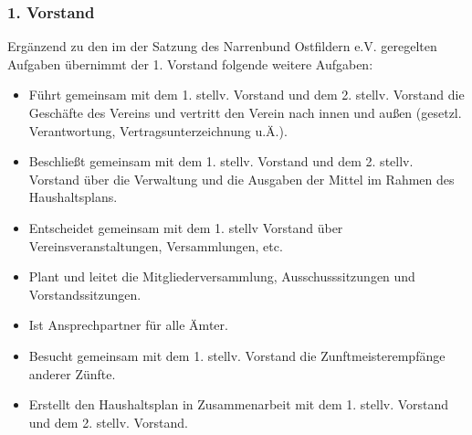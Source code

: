 \subsubsection{1. Vorstand}
Ergänzend zu den im  der Satzung des Narrenbund Ostfildern e.V. geregelten Aufgaben übernimmt der 1. Vorstand folgende weitere Aufgaben:
\begin{itemize}
    \item Führt gemeinsam mit dem 1. stellv. Vorstand und dem 2. stellv. Vorstand die Geschäfte des Vereins und vertritt den Verein nach innen und außen (gesetzl. Verantwortung, Vertragsunterzeichnung u.Ä.).

    \item Beschließt gemeinsam mit dem 1. stellv. Vorstand und dem 2. stellv. Vorstand über die Verwaltung und die Ausgaben der Mittel im Rahmen des Haushaltsplans.

    \item Entscheidet gemeinsam mit dem 1. stellv Vorstand über Vereinsveranstaltungen, Versammlungen, etc.

    \item Plant und leitet die Mitgliederversammlung, Ausschusssitzungen und Vorstandssitzungen.

    \item Ist Ansprechpartner für alle Ämter.

    \item Besucht gemeinsam mit dem 1. stellv. Vorstand die Zunftmeisterempfänge anderer Zünfte.

    \item Erstellt den Haushaltsplan in Zusammenarbeit mit dem 1. stellv. Vorstand und dem 2. stellv. Vorstand.
\end{itemize}

